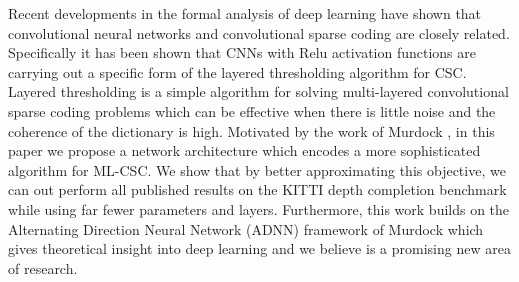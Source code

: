 
Recent developments in the formal analysis of deep learning have shown that convolutional neural networks and convolutional sparse coding are closely related. Specifically it has been shown that CNNs with Relu activation functions are carrying out a specific form of the layered thresholding algorithm for CSC. Layered thresholding is a simple algorithm for solving multi-layered convolutional sparse coding problems which can be effective when there is little noise and the coherence of the dictionary is high. Motivated by the work of Murdock \etal, in this paper we propose a network architecture which encodes a more sophisticated algorithm for ML-CSC. We show that by better approximating this objective, we can out perform all published results on the KITTI depth completion benchmark while using far fewer parameters and layers. Furthermore, this work builds on the Alternating Direction Neural Network (ADNN) framework of Murdock \etal which gives theoretical insight into deep learning and we believe is a promising new area of research.


